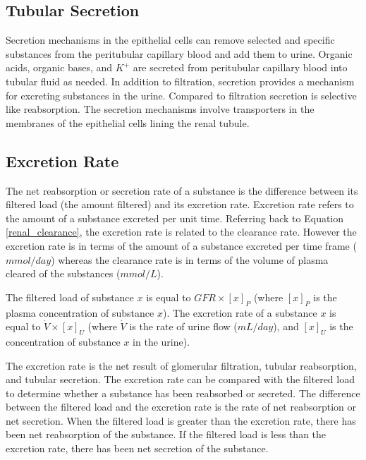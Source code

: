 \subsection{Tubular Secretion}

Secretion mechanisms in the epithelial cells can remove selected and specific substances from the peritubular capillary blood and add them to urine. Organic acids, organic bases, and $K^+$ are secreted from peritubular capillary blood into tubular fluid as needed. In addition to filtration, secretion provides a mechanism for excreting substances in the urine. Compared to filtration secretion is selective like reabsorption. The secretion mechanisms involve transporters in the membranes of the epithelial cells lining the renal tubule.

\subsection{Excretion Rate}

The net reabsorption or secretion rate of a substance is the difference between its filtered load (the amount filtered) and its excretion rate. Excretion rate refers to the amount of a substance excreted per unit time. Referring back to Equation \ref{renal_clearance}, the excretion rate is related to the clearance rate. However the excretion rate is in terms of the amount of a substance excreted per time frame ($mmol/day$) whereas the clearance rate is in terms of the volume of plasma cleared of the substances ($mmol/L$). 

The filtered load of substance $x$ is equal to $GFR \times [x]_P$ (where $[x]_P$ is the plasma concentration of substance $x$). The excretion rate of a substance $x$ is equal to $\dot{V} \times [x]_U$ (where $\dot{V}$ is the rate of urine flow ($mL/day$), and $[x]_U$ is the concentration of substance $x$ in the urine). 

The excretion rate is the net result of glomerular filtration, tubular reabsorption, and tubular secretion. The excretion rate can be compared with the filtered load to determine whether a substance has been reabsorbed or secreted. The difference between the filtered load and the excretion rate is the rate of net reabsorption or net secretion. When the filtered load is greater than the excretion rate, there has been net reabsorption of the substance. If the filtered load is less than the excretion rate, there has been net secretion of the substance.


